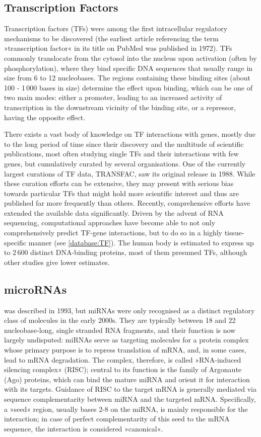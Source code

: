 \subsection{Transcription Factors} \label{intro:TFs}
Transcription factors (TFs) were among the first intracellular regulatory mechanisms to be discovered (the earliest article referencing the term »transcription factor« in its title on PubMed was published in 1972). TFs commonly translocate from the cytosol into the nucleus upon activation (often by phosphorylation), where they bind specific DNA sequences that usually range in size from 6 to 12 nucleobases. The regions containing these binding sites (about 100 - 1\,000 bases in size) determine the effect upon binding, which can be one of two main modes: either a promoter, leading to an increased activity of transcription in the downstream vicinity of the binding site, or a repressor, having the opposite effect. 

There exists a vast body of knowledge on TF interactions with genes, mostly due to the long period of time since their discovery and the multitude of scientific publications, most often studying single TFs and their interactions with few genes, but cumulatively curated by several organisations. One of the currently largest curations of TF data, TRANSFAC, saw its original release in 1988. While these curation efforts can be extensive, they may present with serious bias towards particular TFs that might hold more scientific interest and thus are published far more frequently than others. Recently, comprehensive efforts have extended the available data significantly. Driven by the advent of RNA sequencing, computational approaches have become able to not only comprehensively predict TF-gene interactions, but to do so in a highly tissue-specific manner (see \ref{database:TF}). The human body is estimated to express up to 2\,600 distinct DNA-binding proteins, most of them presumed TFs\cite{Babu2004}, although other studies give lower estimates. 

\subsection{microRNAs} \label{intro:miRNAs}
 was described in 1993\cite{Lee1993}, but miRNAs were only recognised as a distinct regulatory class of molecules in the early 2000s. They are typically between 18 and 22 nucleobase-long, single stranded RNA fragments, and their function is now largely undisputed: miRNAs serve as targeting molecules for a protein complex whose primary purpose is to repress translation of mRNA, and, in some cases, lead to mRNA degradation. The complex, therefore, is called »RNA-induced silencing complex« (RISC); central to its function is the family of Argonaute (Ago) proteins, which can bind the mature miRNA and orient it for interaction with its targets. Guidance of RISC to the target mRNA is generally mediated via sequence complementarity between miRNA and the targeted mRNA. Specifically, a »seed« region, usually bases 2-8 on the miRNA, is mainly responsible for the interaction; in case of perfect complementarity of this seed to the mRNA sequence, the interaction is considered »canonical«.

